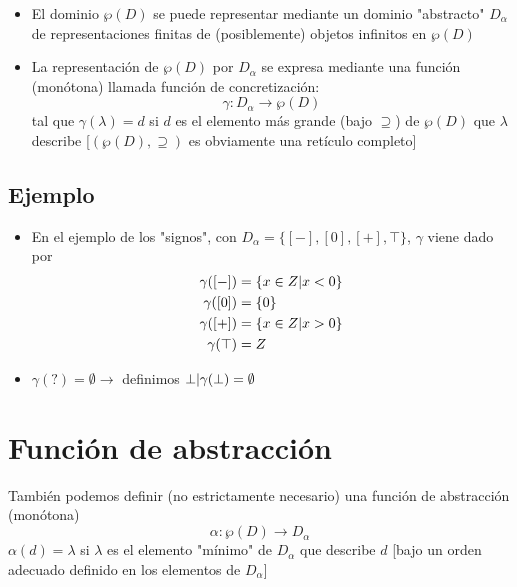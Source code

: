 \documentclass[11pt]{article}
\begin{document}
\begin{itemize}
\item El dominio \(\wp(D)\) se puede representar mediante un dominio
"abstracto" \(D_\alpha\) de representaciones finitas de (posiblemente) objetos infinitos en \(\wp(D)\)
\item La representación de \(\wp(D)\) por \(D_\alpha\) se expresa mediante una
función (monótona) llamada función de concretización: $$\gamma :
  D_\alpha → \wp(D)$$ tal que \(\gamma(\lambda) = d\) si \(d\) es el
elemento más grande (bajo \(\supseteq\)) de \(\wp(D)\) que \(\lambda\)
describe [\((\wp(D), \supseteq)\) es obviamente una retículo completo]
\end{itemize}

\subsection*{Ejemplo}
\label{sec:org09e5d10}
\begin{itemize}
\item En el ejemplo de los "signos", con \(D_\alpha =
  \{[-],[0],[+],\top \}\), \(\gamma\) viene dado por \[
  \begin{align}
     \gamma([-]) &= \{x \in Z \arrowvert x < 0  \} \\
     \gamma([0]) &= \{0\} \\
     \gamma([+]) &= \{x \in Z \arrowvert x > 0\} \\
     \gamma(\top) &= Z \\
     \end{align} \]
\item \(\gamma(?) = \emptyset \rightarrow\) definimos \(\bot \arrowvert \gamma(\bot) = \emptyset\)
\end{itemize}


\section*{Función de abstracción}
\label{sec:orgca2fb50}

También podemos definir (no estrictamente necesario) una función de
 abstracción (monótona) $$\alpha : \wp(D) \rightarrow D_\alpha$$
 \(\alpha(d) = \lambda\) si \(\lambda\) es el elemento "mínimo" de
 \(D_\alpha\) que describe \(d\) [bajo un orden adecuado definido en los
 elementos de \(D_\alpha\)] 
\end{document}
